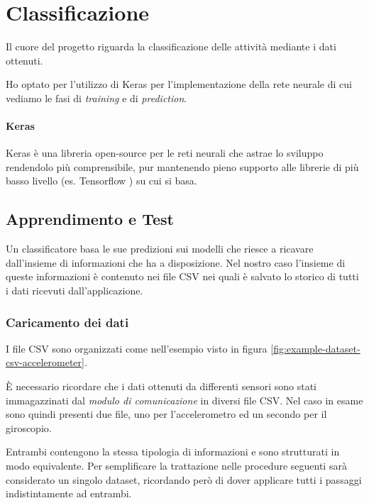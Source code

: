 \chapter{Classificazione}
\label{chapter:classification}

Il cuore del progetto riguarda la classificazione delle attività mediante i dati ottenuti.

Ho optato per l'utilizzo di Keras per l'implementazione della rete neurale di cui vediamo le 
fasi di \textit{training} e di \textit{prediction}.
\subsubsection{Keras}
Keras \cite{keras} è una libreria open-source per le reti neurali che astrae lo sviluppo rendendolo più comprensibile, 
pur mantenendo pieno supporto alle librerie di più basso livello (es. Tensorflow \cite{tensorflow}) su cui si basa.



\section{Apprendimento e Test}
Un classificatore basa le sue predizioni sui modelli che riesce a ricavare dall'insieme di informazioni che ha a disposizione.
Nel nostro caso l'insieme di queste informazioni è contenuto nei file CSV nei quali è salvato lo storico di tutti 
i dati ricevuti dall'applicazione.


\subsection{Caricamento dei dati}
I file CSV sono organizzati come nell'esempio visto in figura \ref{fig:example-dataset-csv-accelerometer}.

\vspace{5mm} %

È necessario ricordare che i dati ottenuti da differenti sensori sono stati immagazzinati dal \textit{modulo di comunicazione} in diversi file CSV. 
Nel caso in esame sono quindi presenti due file, uno per l'accelerometro ed un secondo per il giroscopio.

\vspace{5mm} %

Entrambi contengono la stessa tipologia di informazioni e sono strutturati in modo equivalente.
Per semplificare la trattazione nelle procedure seguenti sarà considerato un singolo dataset, ricordando però di dover applicare tutti i 
passaggi indistintamente ad entrambi.

